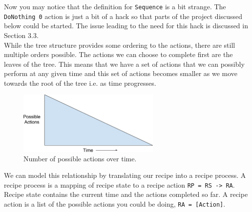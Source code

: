 \documentclass[11pt]{article}
\begin{document}
    Now you may notice that the definition for \texttt{Sequence} is a bit strange. The
    \texttt{DoNothing 0} action is just a bit of a hack so that parts of the project
    discussed below could be started. The issue leading to the need for this hack
    is discussed in Section 3.3. \\

    While the tree structure provides some ordering to the actions, there are still
    multiple orders possible. The actions we can choose to complete first are the
    leaves of the tree. This means that we have a set of actions that we can possibly
    perform at any given time and this set of actions becomes smaller as we move
    towards the root of the tree i.e. as time progresses. \\

    \begin{figure}[ht]
        \centering
            \includegraphics[width=7cm,keepaspectratio]{actions_time.png}
        \caption{Number of possible actions over time.}
    \end{figure}
    
    We can model this relationship by translating our recipe into a recipe process.
    A recipe process is a mapping of recipe state to a recipe action \texttt{RP = RS -> RA}.
    Recipe state contains the current time and the actions completed so far. A recipe
    action is a list of the possible actions you could be doing, \texttt{RA = [Action]}. \\  
\end{document}

